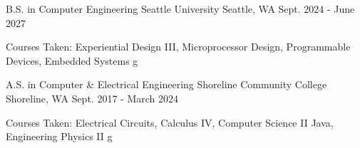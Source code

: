 

\begin{cventries}

  \cventry
    {B.S. in Computer Engineering} %
    {Seattle University} %
    {Seattle, WA} %
    {Sept. 2024 - June 2027} %
    {
      \begin{cvitems} %
        \item {Courses Taken: Experiential Design III, Microprocessor Design, Programmable Devices, Embedded Systems g}
      \end{cvitems}
    }

  \cventry
    {A.S. in Computer \& Electrical Engineering} %
    {Shoreline Community College} %
    {Shoreline, WA} %
    {Sept. 2017 - March 2024} %
    {
      \begin{cvitems} %
        \item {Courses Taken: Electrical Circuits, Calculus IV, Computer Science II Java, Engineering Physics II g}
      \end{cvitems}
    }
    
\end{cventries}

